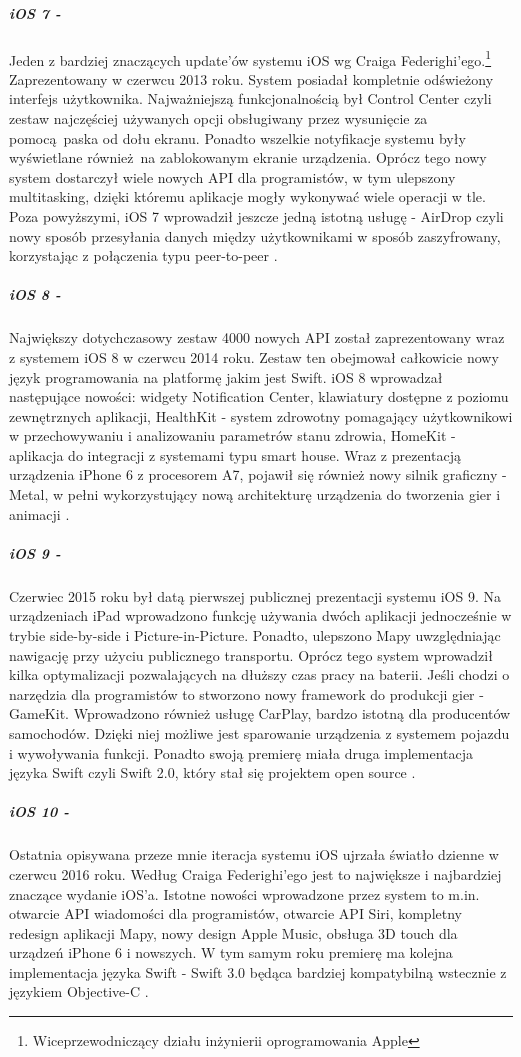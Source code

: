 \documentclass[12pt,oneside,a4paper]{report}
\begin{document}
\subparagraph{iOS 7 -}Jeden z bardziej znaczących update'ów systemu iOS wg Craiga Federighi'ego.\footnote{Wiceprzewodniczący działu inżynierii oprogramowania Apple} Zaprezentowany w czerwcu 2013 roku. System posiadał kompletnie odświeżony interfejs użytkownika. Najważniejszą funkcjonalnością był Control Center czyli zestaw najczęściej używanych opcji obsługiwany przez wysunięcie za pomocą paska od dołu ekranu. Ponadto wszelkie notyfikacje systemu były wyświetlane również na zablokowanym ekranie urządzenia. Oprócz tego nowy system dostarczył wiele nowych API dla programistów, w tym ulepszony multitasking, dzięki któremu aplikacje mogły wykonywać wiele operacji w tle. Poza powyższymi, iOS 7 wprowadził jeszcze jedną istotną usługę - AirDrop czyli nowy sposób przesyłania danych między użytkownikami w sposób zaszyfrowany, korzystając z połączenia typu peer-to-peer \cite{ios7}.
\subparagraph{iOS 8 -}Największy dotychczasowy zestaw 4000 nowych API został zaprezentowany wraz z systemem iOS 8 w czerwcu 2014 roku. Zestaw ten obejmował całkowicie nowy język programowania na platformę jakim jest Swift. iOS 8 wprowadzał następujące nowości: widgety Notification Center, klawiatury dostępne z poziomu zewnętrznych aplikacji, HealthKit - system zdrowotny pomagający użytkownikowi w przechowywaniu i analizowaniu parametrów stanu zdrowia, HomeKit - aplikacja do integracji z systemami typu smart house. Wraz z prezentacją urządzenia iPhone 6 z procesorem A7, pojawił się również nowy silnik graficzny - Metal, w pełni wykorzystujący nową architekturę urządzenia do tworzenia gier i animacji \cite{ios8}.
\subparagraph{iOS 9 -}Czerwiec 2015 roku był datą pierwszej publicznej prezentacji systemu iOS 9. Na urządzeniach iPad wprowadzono funkcję używania dwóch aplikacji jednocześnie w trybie side-by-side i Picture-in-Picture. Ponadto, ulepszono Mapy uwzględniając nawigację przy użyciu publicznego transportu. Oprócz tego system wprowadził kilka optymalizacji pozwalających na dłuższy czas pracy na baterii. Jeśli chodzi o narzędzia dla programistów to stworzono nowy framework do produkcji gier - GameKit. Wprowadzono również usługę CarPlay, bardzo istotną dla producentów samochodów. Dzięki niej możliwe jest sparowanie urządzenia z systemem pojazdu i wywoływania funkcji. Ponadto swoją premierę miała druga implementacja języka Swift czyli Swift 2.0, który stał się projektem open source \cite{ios9}.
\subparagraph{iOS 10 -}Ostatnia opisywana przeze mnie iteracja systemu iOS ujrzała światło dzienne w czerwcu 2016 roku. Według Craiga Federighi'ego jest to największe i najbardziej znaczące wydanie iOS'a. Istotne nowości wprowadzone przez system to m.in. otwarcie API wiadomości dla programistów, otwarcie API Siri, kompletny redesign aplikacji Mapy, nowy design Apple Music, obsługa 3D touch dla urządzeń iPhone 6 i nowszych. W tym samym roku premierę ma kolejna implementacja języka Swift - Swift 3.0 będąca bardziej kompatybilną wstecznie z językiem Objective-C  \cite{compatibility,ios10}.
\end{document}
